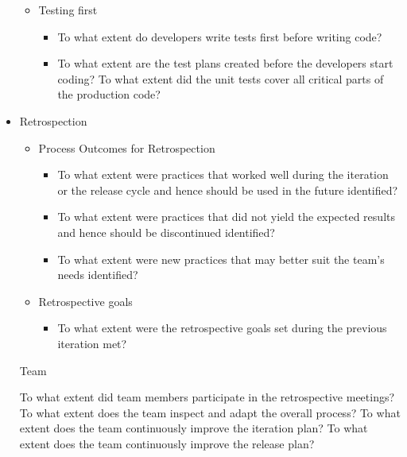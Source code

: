 \begin{appendices}
\begin{itemize}
\begin{itemize}
\begin{itemize}
				\end{itemize}
		\end{itemize}
		\begin{itemize}
			\item Testing first
				\begin{itemize}
					\item To what extent do developers write tests first before writing code?
					\item To what extent are the test plans created before the developers start coding?
					\addition To what extent did the unit tests cover all critical parts of the production code?
				\end{itemize}
		\end{itemize}
	\item Retrospection
		\begin{itemize}
			\item Process Outcomes for Retrospection
				\begin{itemize}
					\item To what extent were practices that worked well during the iteration or the release cycle and hence should be used in the future identified?
					\item To what extent were practices that did not yield the expected results and hence should be discontinued identified?
					\item To what extent were new practices that may better suit the team's needs identified?
				\end{itemize}
		\end{itemize}
		\begin{itemize}
			\item Retrospective goals
				\begin{itemize}
					\item To what extent were the retrospective goals set during the previous iteration met?
				\end{itemize}
		\end{itemize}
		\begin{itemize}
			\addition Team
				\begin{itemize}
					\addition To what extent did team members participate in the retrospective meetings?
					\addition To what extent does the team inspect and adapt the overall process?
					\addition To what extent does the team continuously improve the iteration plan?
					\addition To what extent does the team continuously improve the release plan?

\end{itemize}
\end{itemize}
\end{itemize}
\end{appendices}

